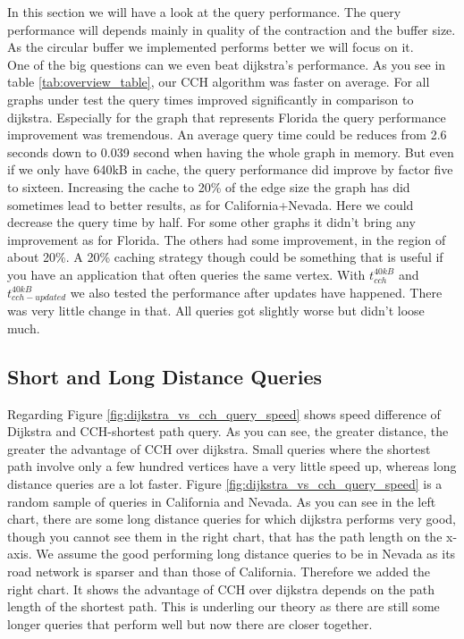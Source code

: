 In this section we will have a look at the query performance.
The query performance will depends mainly in quality of the contraction and the buffer size.
As the circular buffer we implemented performs better we will focus on it.
\\ 
One of the big questions can we even beat dijkstra's performance.
As you see in table \ref{tab:overview_table}, our CCH algorithm was faster on average.
For all graphs under test the query times improved significantly in comparison to dijkstra.
Especially for the graph that represents Florida the query performance improvement was tremendous.
An average query time could be reduces from 2.6 seconds down to 0.039 second when having the whole graph in memory.
But even if we only have 640kB in cache, the query performance did improve by factor five to sixteen.
Increasing the cache to 20\% of the edge size the graph has did sometimes lead to better results, as for California+Nevada.
Here we could decrease the query time by half.
For some other graphs it didn't bring any improvement as for Florida.
The others had some improvement, in the region of about 20\%.
A 20\% caching strategy though could be something that is useful if you have an application that often queries the same vertex.
With $t^{40kB}_{cch}$ and $t^{40kB}_{cch-updated}$ we also tested the performance after updates have happened.
There was very little change in that.
All queries got slightly worse but didn't loose much.

\subsection{Short and Long Distance Queries}

Regarding Figure \ref{fig:dijkstra_vs_cch_query_speed} shows speed difference of Dijkstra and CCH-shortest path query.
As you can see, the greater distance, the greater the advantage of CCH over dijkstra.
Small queries where the shortest path involve only a few hundred vertices have a very little speed up, whereas long distance queries are a lot faster.
Figure \ref{fig:dijkstra_vs_cch_query_speed} is a random sample of queries in California and Nevada.
As you can see in the left chart, there are some long distance queries for which dijkstra performs very good, though you cannot see them in the right chart, that has the path length on the x-axis.
We assume the good performing long distance queries to be in Nevada as its road network is sparser and than those of California.
Therefore we added the right chart.
It shows the advantage of CCH over dijkstra depends on the path length of the shortest path.
This is underling our theory as there are still some longer queries that perform well but now there are closer together.

